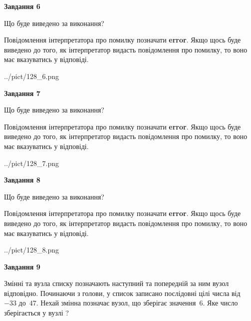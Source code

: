 \documentclass[12pt, ukrainian]{article}
\begin{document}
{\begin {large}
{\begin {center}\textbf{Завдання 6}\end {center}}\par
Що буде виведено за виконання?

Повідомлення інтерпретатора про помилку позначати \textbf{error}.
Якщо щось буде виведено до того, як інтерпретатор видасть повідомлення про помилку, 
то воно має вказуватись у відповіді. \par


\begin{center}
	{../pict/128_6.png}
\end{center}
\newpage

{\begin {center}\textbf{Завдання 7}\end {center}}\par
Що буде виведено за виконання?

Повідомлення інтерпретатора про помилку позначати \textbf{error}.
Якщо щось буде виведено до того, як інтерпретатор видасть повідомлення про помилку, 
то воно має вказуватись у відповіді. \par


\begin{center}
	{../pict/128_7.png}
\end{center}
\newpage

{\begin {center}\textbf{Завдання 8}\end {center}}\par
Що буде виведено за виконання?

Повідомлення інтерпретатора про помилку позначати \textbf{error}.
Якщо щось буде виведено до того, як інтерпретатор видасть повідомлення про помилку, 
то воно має вказуватись у відповіді. \par


\begin{center}
	{../pict/128_8.png}
\end{center}
\newpage

{\begin {center}\textbf{Завдання 9}\end {center}}\par
Змінні  та  вузла списку позначають наступний та попередній за ним вузол відповідно. Починаючи з голови, у список записано послідовні цілі числа від~$-33$ до~$47$. Нехай змінна  позначає вузол, що зберігає значення~$6$.
Яке число зберігається у вузлі  ?\par
\newpage


\end{large}}
\end{document}
